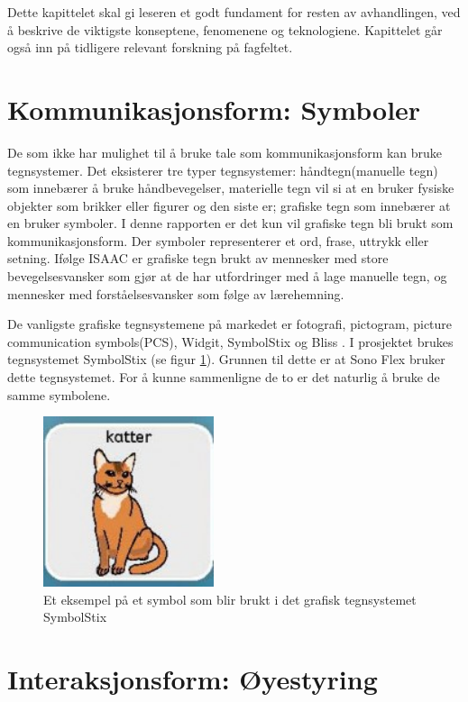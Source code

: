\documentclass[phd,tocprelim]{cornell}
\begin{document}
Dette kapittelet skal gi leseren et godt fundament for resten av avhandlingen, ved å beskrive de viktigste konseptene, fenomenene og teknologiene. Kapittelet går også inn på tidligere relevant forskning på fagfeltet. 

\section{Kommunikasjonsform: Symboler}

De som ikke har mulighet til å bruke tale som kommunikasjonsform kan bruke tegnsystemer. Det eksisterer tre typer tegnsystemer: håndtegn(manuelle tegn) som innebærer å bruke håndbevegelser, materielle tegn vil si at en bruker fysiske objekter som brikker eller figurer og den siste er; grafiske tegn som innebærer at en bruker symboler. I denne rapporten er det kun vil grafiske tegn bli brukt som kommunikasjonsform. Der symboler representerer et ord, frase, uttrykk eller setning. Ifølge ISAAC \cite{Tegnsystemer} er grafiske tegn brukt av mennesker med store bevegelsesvansker som gjør at de har utfordringer med å lage manuelle tegn, og mennesker med forståelsesvansker som følge av lærehemning.

De vanligste grafiske tegnsystemene på markedet er fotografi, pictogram, picture communication symbols(PCS), Widgit, SymbolStix og Bliss \cite{GrafiskTegn}. I prosjektet brukes tegnsystemet SymbolStix (se figur \ref{fig:katt}). Grunnen til dette er at Sono Flex bruker dette tegnsystemet. For å kunne sammenligne de to er det naturlig å bruke de samme symbolene.


\begin{figure}[ht!]
\centering
\includegraphics[width=50mm]{katt}
\caption{Et eksempel på et symbol som blir brukt i det grafisk tegnsystemet SymbolStix}
\label{fig:katt}
\end{figure}

\section{Interaksjonsform: Øyestyring}
\end{document}
